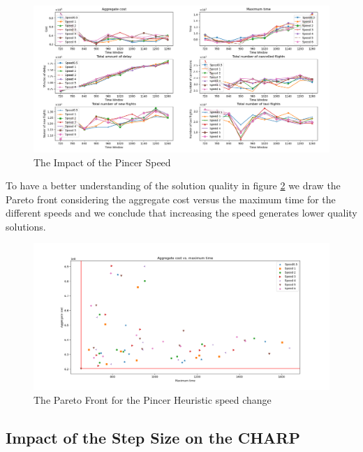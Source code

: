 	\begin{figure}[h!]
		\centering
		\includegraphics[width=\textwidth]{figures/speed.png}
		\caption[]{The Impact of the Pincer Speed}
		\label{fig:speed}
	\end{figure}

To have a better understanding of the solution quality in figure \ref{fig:costTimeSpeed} we draw the Pareto front considering the aggregate cost versus the maximum time for the different speeds and we conclude that increasing the speed generates lower quality solutions.

	\begin{figure}[h!]
		\centering
		\includegraphics[width=\textwidth]{figures/costTimeSpeed.png}
		\caption[]{The Pareto Front for the Pincer Heuristic speed change}
		\label{fig:costTimeSpeed}
	\end{figure}

\subsection{Impact of the Step Size on the CHARP}

